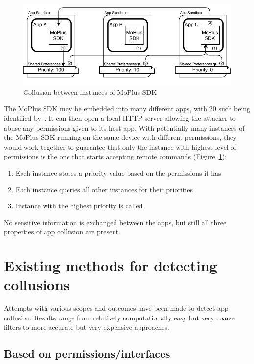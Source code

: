 \documentclass[article, oneside]{aaltoseries}
\newcommand{\Fref}[1]{Figure~\ref{#1}}
\begin{document}
\begin{figure}[h]
	\centering
	\includegraphics[width=1.0\textwidth]{figures/Collusion2}
	\caption{Collusion between instances of MoPlus SDK~\cite{Blasco2016}}
	\label{fig:moplus}
\end{figure}

The MoPlus SDK may be embedded into many different apps, with 20 such being identified by~\cite{Blasco2016}. It can then open a local HTTP server allowing the attacker to abuse any permissions given to its host app. With potentially many instances of the MoPlus SDK running on the same device with different permissions, they would work together to guarantee that only the instance with highest level of permissions is the one that starts accepting remote commands (\Fref{fig:moplus}):
\begin{enumerate}[nosep,label={(\arabic*)}]
	\item Each instance stores a priority value based on the permissions it has
	\item Each instance queries all other instances for their priorities
	\item Instance with the highest priority is called
\end{enumerate}
No sensitive information is exchanged between the apps, but still all three properties of app collusion are present.

\section{Existing methods for detecting collusions}
\label{sec:approaches}

Attempts with various scopes and outcomes have been made to detect app collusion. Results range from relatively computationally easy but very coarse filters to more accurate but very expensive approaches.

\subsection{Based on permissions/interfaces}
\label{sec:filter}
\end{document}
